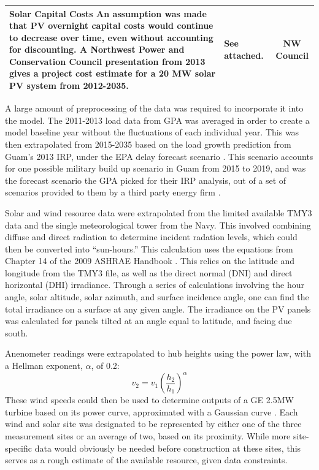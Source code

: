 \documentclass[12pt,letterpaper,fleqn]{article}
\begin{document}
\begin{center}
\begin{longtable}{| p{11cm} | p{3cm} | c | }
    \textbf{Solar Capital Costs} An assumption was made that PV
    overnight capital costs would continue to decrease over time,
    even without accounting for discounting. A Northwest Power and
    Conservation Council presentation from 2013 gives a project cost
    estimate for a 20 MW solar PV system from 2012-2035.  
    & See attached. 
    & NW Council \cite{simmons13} 
    \\\hline

  \end{longtable}
\end{center}

A large amount of preprocessing of the data was required to
incorporate it into the model. The 2011-2013 load data from GPA was
averaged in order to create a model baseline year without the
fluctuations of each individual year. This was then extrapolated from
2015-2035 based on the load growth prediction from Guam's 2013 IRP,
under the EPA delay forecast scenario \cite{cruz13}. This scenario
accounts for one possible military build up scenario in Guam from 2015
to 2019, and was the forecast scenario the GPA picked for their IRP
analysis, out of a set of scenarios provided to them by a third party
energy firm \cite{cruz13}.

Solar and wind resource data were extrapolated from the limited
available TMY3 data and the single meteorological tower from the
Navy. This involved combining diffuse and direct radiation to
determine incident radation levels, which could then be converted into
``sun-hours.'' This calculation uses the equations from Chapter 14 of
the 2009 ASHRAE Handbook \cite{ashrae}. This relies on the latitude
and longitude from the TMY3 file, as well as the direct normal (DNI)
and direct horizontal (DHI) irradiance. Through a series of
calculations involving the hour angle, solar altitude, solar azimuth,
and surface incidence angle, one can find the total irradiance on a
surface at any given angle. The irradiance on the PV panels was
calculated for panels tilted at an angle equal to latitude, and facing
due south.

Anenometer readings were extrapolated to hub heights
using the power law, with a Hellman exponent, $\alpha$, of 0.2:
\[v_2 = v_1\left(\frac{h_2}{h_1}\right)^\alpha\] 
These wind speeds could then be used to determine outputs of a GE
2.5MW turbine based on its power curve, approximated with a Gaussian
curve \cite{ge}. Each wind and solar site was designated to be
represented by either one of the three measurement sites or an average
of two, based on its proximity. While more site-specific data would
obviously be needed before construction at these sites, this serves as
a rough estimate of the available resource, given data constraints.
\end{document}
